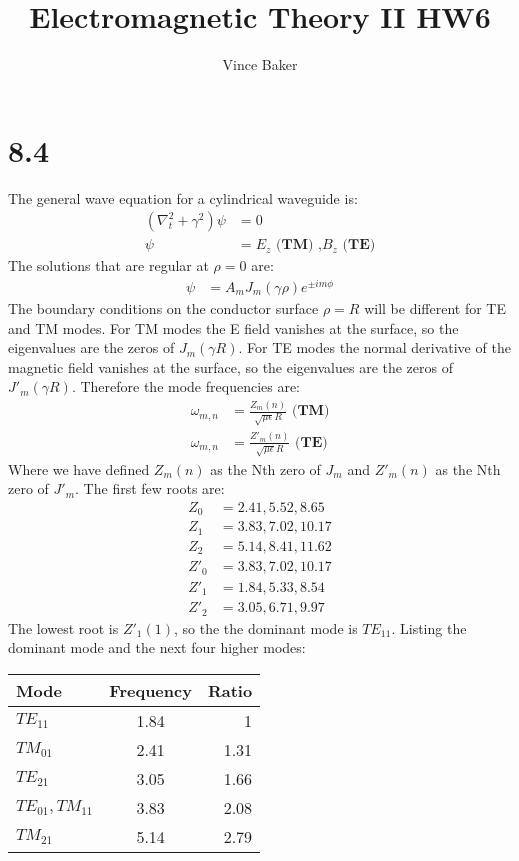 \documentclass[a4paper,11pt]{article}
\title{Electromagnetic Theory II HW6}
\author{Vince Baker}
\numberwithin{equation}{section}
\newcommand{\lrp}[1]{\left({#1}\right)}
\begin{document}
\maketitle

\section*{8.4}
The general wave equation for a cylindrical waveguide is:
\begin{align}
 \lrp{\nabla_t^2+\gamma^2}\psi &= 0\\
 \psi &= E_z\textbf{ (TM) ,}B_z\textbf{ (TE)}
\end{align}
The solutions that are regular at $\rho=0$ are:
\begin{align}
 \psi &= A_m J_m(\gamma\rho)e^{\pm im\phi}
\end{align}
The boundary conditions on the conductor surface $\rho=R$ will be different for TE and TM modes.
For TM modes the E field vanishes at the surface, so the eigenvalues are the zeros of $J_m(\gamma R)$.
For TE modes the normal derivative of the magnetic field vanishes at the surface, so the eigenvalues are the zeros of $J'_m(\gamma R)$.
Therefore the mode frequencies are:
\begin{align}
 \omega_{m,n} &= \frac{Z_m(n)}{\sqrt{\mu\epsilon}R}\textbf{ (TM)}\\
 \omega_{m,n} &= \frac{Z'_m(n)}{\sqrt{\mu\epsilon}R}\textbf{ (TE)}
\end{align}
Where we have defined $Z_m(n)$ as the Nth zero of $J_m$ and $Z'_m(n)$ as the Nth zero of $J'_m$. 
The first few roots are:
\begin{align}
 Z_0 &= 2.41, 5.52, 8.65\\
 Z_1 &= 3.83, 7.02, 10.17\\
 Z_2 &= 5.14, 8.41, 11.62\\
 Z'_0 &= 3.83, 7.02, 10.17\\
 Z'_1 &= 1.84, 5.33, 8.54\\
 Z'_2 &= 3.05, 6.71, 9.97
\end{align}
The lowest root is $Z'_1(1)$, so the the dominant mode is $TE_{11}$. 
Listing the dominant mode and the next four higher modes:
\begin{tabular}{l | c | r}
 Mode & Frequency & Ratio\\
 \hline
 $TE_{11}$ & 1.84  & 1\\
 $TM_{01}$ & 2.41  & 1.31 \\
 $TE_{21}$ & 3.05 & 1.66\\
 $TE_{01},TM_{11}$ & 3.83 & 2.08\\
 $TM_{21}$ & 5.14 & 2.79
\end{tabular}
\end{document}
